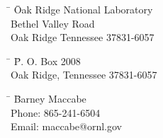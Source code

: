 \thispagestyle{empty}

\begin{center}
\textbf{\Large \baseproposaltitle}
\end{center}

\begin{center}
\end{center}

\medskip

\begin{tabbing}
\hspace*{10mm} \=  \= Oak Ridge National Laboratory \\
\>   Bethel Valley Road\\
\> \> Oak Ridge Tennessee 37831-6057\\
\end{tabbing}


\begin{tabbing}
\hspace*{10mm} \=  \= P. O. Box 2008 \\
\> \> Oak Ridge, Tennessee 37831-6057 \\
\end{tabbing}


\begin{tabbing}
\hspace*{10mm} \=  \= Barney Maccabe \\
\> \> Phone: 865-241-6504 \\
\> \> Email: maccabe@ornl.gov
\end{tabbing}

